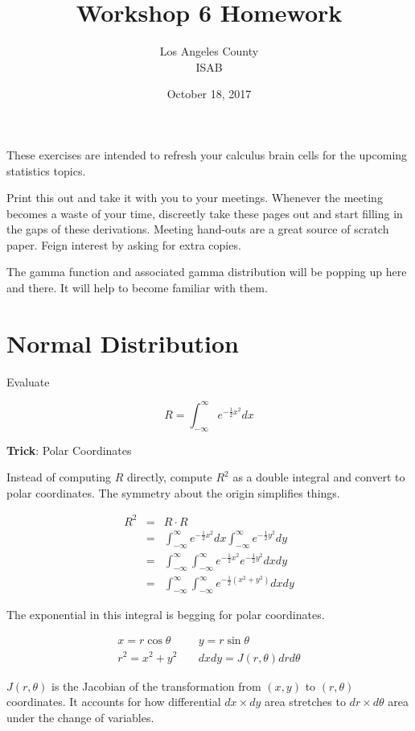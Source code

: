 \documentclass[]{article}
\title{Workshop 6 Homework}
\author{Los Angeles County\\ISAB}
\date{October 18, 2017}
\begin{document}
\maketitle
These exercises are intended to refresh your calculus brain
cells for the upcoming statistics topics.

Print this out and take it with you to your meetings.
Whenever the meeting becomes a waste of your time, discreetly take
these pages out and start filling in the gaps of these derivations.
Meeting hand-outs are a great source of scratch paper.
Feign interest by asking for extra copies.

The gamma function and associated gamma distribution
will be popping up here and there.  It will help to become
familiar with them.

\section*{Normal Distribution}


Evaluate

$$
R = \int_{-\infty}^{\infty} e^{-\frac{1}{2} x^2} dx
$$

\textbf{Trick}: Polar Coordinates

Instead of computing $R$ directly, compute $R^2$ as a
double integral and convert to polar coordinates.  The
symmetry about the origin simplifies things.

\begin{eqnarray*}
R^2 &= & R \cdot R \\
  &= & \int_{-\infty}^{\infty} e^{-\frac{1}{2} x^2} dx 
       \int_{-\infty}^{\infty} e^{-\frac{1}{2} y^2} dy \\
  &= & \int_{-\infty}^{\infty} \int_{-\infty}^{\infty}
       e^{-\frac{1}{2} x^2} e^{-\frac{1}{2} y^2} dx dy \\
  &= & \int_{-\infty}^{\infty} \int_{-\infty}^{\infty}
       e^{-\frac{1}{2} (x^2 + y^2)} dx dy
\end{eqnarray*}

The exponential in this integral is begging for polar
coordinates.

\begin{eqnarray*}
x = r \cos\theta & \; & y = r \sin\theta \\
r^2 = x^2 + y^2 & \; & dx dy = J(r,\theta) dr d\theta
\end{eqnarray*}

$J(r,\theta)$ is the Jacobian of the transformation from
$(x,y)$ to $(r,\theta)$ coordinates.  It accounts for how
differential $dx \times dy$ area stretches to $dr \times d\theta$
area under the change of variables.
\end{document}
